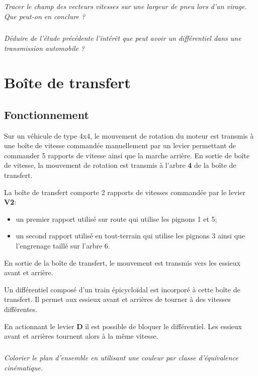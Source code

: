 \documentclass[10pt]{article}
\begin{document}
\subparagraph{}
\textit{Tracer le champ des vecteurs vitesses sur une largeur de pneu lors d'un virage. Que peut-on en conclure ?}



\subparagraph{}
\textit{Déduire de l'étude précédente l'intérêt que peut avoir un différentiel dans une transmission automobile ? }


\section{Boîte de transfert}

\subsection{Fonctionnement}

Sur un véhicule de type 4x4, le mouvement de rotation du moteur est transmis à une boîte de vitesse commandée manuellement par un levier permettant de commander 5 rapports de vitesse ainsi que la marche arrière. En sortie de boîte de vitesse, la mouvement de rotation est transmis à l'arbre \textbf{4} de la boîte de transfert. 


La boîte de transfert comporte 2 rapports de vitesses commandée par le levier  \textbf{V2}: 
\begin{itemize}
\item un premier rapport utilisé sur route qui utilise les pignons 1 et 5;
\item un second rapport utilisé en tout-terrain qui utilise les pignons 3 ainsi que l'engrenage taillé sur l'arbre 6.
\end{itemize}

En sortie de la boîte de transfert, le mouvement est transmis vers les essieux avant et arrière. 

Un différentiel composé d'un train épicycloïdal est incorporé à cette boîte de transfert. Il permet aux essieux avant et arrières de tourner à des vitesses différentes. 

En actionnant le levier \textbf{D} il est possible de bloquer le différentiel. Les essieux avant et arrières tournent alors à la même vitesse. 

\subparagraph{}
\textit{Colorier le plan d'ensemble en utilisant une couleur par classe d'équivalence cinématique.}
\end{document}

